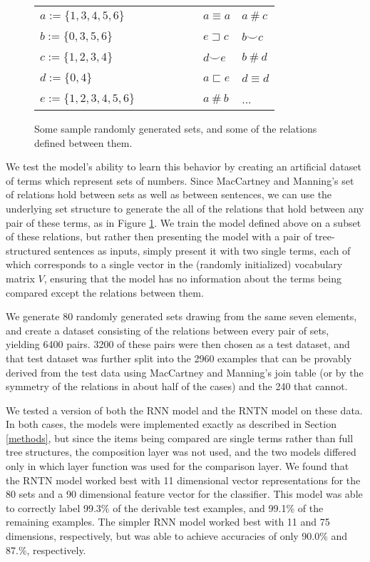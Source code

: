 \begin{figure}[t]
\begin{center}
\begin{tabular}{ll|lll}
$a := \{1, 3, 4, 5, 6\}	$&~~~&~~~& $a \equiv a$	    	& $a~\#~c$	\\
$b := \{0, 3, 5, 6\}	$&~~~&~~~& $e \sqsupset c$	&$b \smallsmile c$		\\
$c := \{1, 2, 3, 4\}	$&~~~&~~~& $d \smallsmile e$	& $b~\#~d$		\\
$d := \{0, 4\}		$&~~~&~~~& $a \sqsubset e$	& $ d \equiv d$	\\
$e := \{1, 2, 3, 4, 5, 6\}$&~~~&~~~& $a~\#~b$		& ... 	\\
\end{tabular}
\end{center}

\caption{Some sample randomly generated sets, and some of the relations defined between them.  \label{lattice-figure}} 
\end{figure}

We test the model's ability to learn this behavior by creating an artificial dataset of terms which represent sets of numbers. Since MacCartney and Manning's set of relations hold between sets as well as between sentences, we can use the underlying set structure to generate the all of the relations that hold between any pair of these terms, as in Figure \ref{lattice-figure}. We train the model defined above on a subset of these relations, but rather then presenting the model with a pair of tree-structured sentences as inputs, simply present it with two single terms, each of which corresponds to a single vector in the (randomly initialized) vocabulary matrix $V$, ensuring that the model has no information about the terms being compared except the relations between them.

We generate 80 randomly generated sets drawing from the same seven elements, and create a dataset consisting of the relations between every pair of sets, yielding 6400 pairs. 3200 of these pairs were then chosen as a test dataset, and that test dataset was further split into the 2960 examples that can be provably derived from the test data using MacCartney and Manning's join table (or by the symmetry of the relations in about half of the cases) and the 240 that cannot. %

We tested a version of both the RNN model and the RNTN model on these data. In both cases, the models were implemented exactly as described in Section \ref{methods}, but since the items being compared are single terms rather than full tree structures, the composition layer was not used, and the two models differed only in which layer function was used for the comparison layer.
We found that the RNTN model worked best with 11 dimensional vector representations for the 80 sets and a 90 dimensional feature vector for the classifier. This model was able to correctly label 99.3\% of the derivable test examples, and 99.1\% of the remaining examples. The simpler RNN model worked best with 11 and 75 dimensions, respectively, but was able to achieve accuracies of only 90.0\% and 87.\%, respectively.

